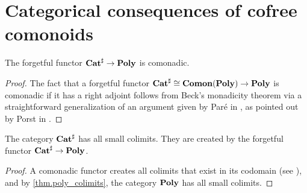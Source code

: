 \documentclass[Book-Poly]{subfiles}
\begin{document}


\section{Categorical consequences of cofree comonoids}

\begin{proposition}[Porst]
The forgetful functor $\mathbf{Cat}^\sharp\to\mathbf{Poly}$ is comonadic.
\end{proposition}
\begin{proof}
The fact that a forgetful functor $\mathbf{Cat}^\sharp\cong\mathbf{Comon}(\mathbf{Poly})\to\mathbf{Poly}$ is comonadic if it has a right adjoint follows from Beck's monadicity theorem via a straightforward generalization of an argument given by Par{\'e} in \cite[pp.~138-9]{pare1969absolute}, as pointed out by Porst in \cite[Fact~3.1]{porst2019colimits}.
\end{proof}

\begin{corollary}
The category $\mathbf{Cat}^\sharp$ has all small colimits.
They are created by the forgetful functor $\mathbf{Cat}^\sharp\to\mathbf{Poly}$.
\end{corollary}
\begin{proof}
A comonadic functor creates all colimits that exist in its codomain (see \cite{nlab:created-limit}), and by \cref{thm.poly_colimits}, the category $\mathbf{Poly}$ has all small colimits.
\end{proof}
\end{document}
